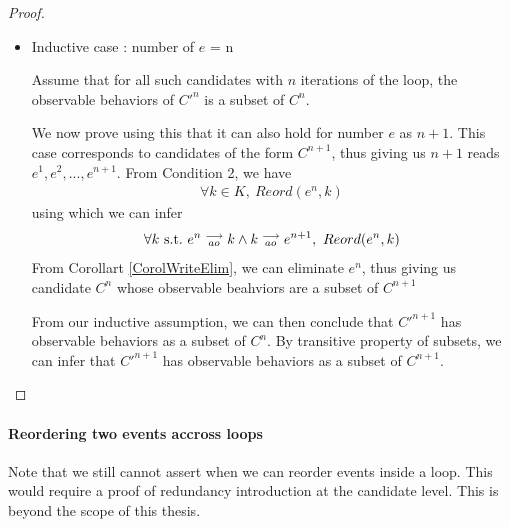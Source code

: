 \begin{proof}
\begin{itemize}
                    \item Inductive case : number of $e$ = n

                    Assume that for all such candidates with $n$ iterations of the loop, the observable behaviors of $C'^n$ is a subset of $C^n$.

                    We now prove using this that it can also hold for number $e$ as $n + 1$. 
                    This case corresponds to candidates of the form $C^{n+1}$, thus giving us $n+1$ reads $e^1, e^2,...,e^{n+1}$.
                    From Condition 2, we have
                    \begin{align*}
                        \forall k \in K, \ Reord(e^{n}, k)
                    \end{align*}
                    using which we can infer 
                    \begin{align*}
                        \forall k \ \text{s.t.} \ e^n\stackrel{\longrightarrow}{_{ao}}k \wedge k\stackrel{\longrightarrow}{_{ao}}e^{n+1}, \ Reord(e^{n}, k)
                    \end{align*}
                    From Corollart \ref{CorolWriteElim}, we can eliminate $e^{n}$, thus giving us candidate $C^{n}$ whose observable beahviors are a subset of $C^{n+1}$

                    From our inductive assumption, we can then conclude that $C'^{n+1}$ has observable behaviors as a subset of $C^n$. 
                    By transitive property of subsets, we can infer that $C'^{n+1}$ has observable behaviors as a subset of $C^{n+1}$.



                \end{itemize}

            \end{proof}
            
        \paragraph{Reordering two events accross loops} 
            
            Note that we still cannot assert when we can reorder events inside a loop. This would require a proof of redundancy introduction at the candidate level. This is beyond the scope of this thesis. 

